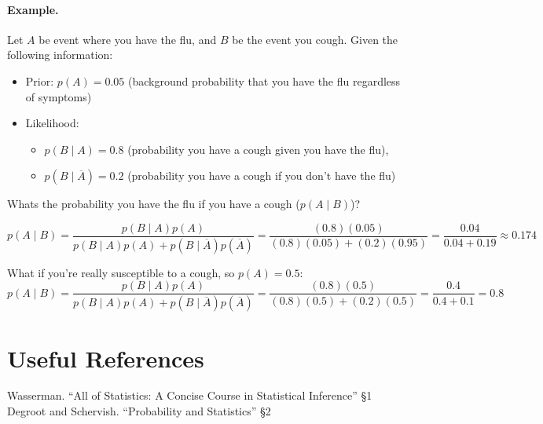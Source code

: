 \paragraph{Example.} 
Let $A$ be event where you have the flu, and $B$ be the event you cough. 
Given the following information: 
\begin{itemize}
\item[] Prior: $p(A)=0.05$ (background probability that you have the flu regardless of symptoms)
\item[] Likelihood:
\begin{itemize} 
\item $p(B\mid A) = 0.8$ (probability you have a cough given you have the flu), 
\item $p(B\mid \overline A) = 0.2$ (probability you have a cough if you don't have the flu)
\end{itemize}
\end{itemize}
Whats the probability you have the flu if you have a cough ($p(A\mid B)$)?

\[p(A\mid B) = \frac{p(B\mid A)p(A)}{p(B\mid A)p(A) + p(B\mid \overline A)p(\overline A)} = \frac{(0.8)(0.05)}{(0.8)(0.05)+(0.2)(0.95)}=\frac{0.04}{0.04+0.19}\approx 0.174\]

What if you're really susceptible to a cough, so $p(A)=0.5$:
\[p(A\mid B) = \frac{p(B\mid A)p(A)}{p(B\mid A)p(A) + p(B\mid \overline A)p(\overline A)} = \frac{(0.8)(0.5)}{(0.8)(0.5)+(0.2)(0.5)}=\frac{0.4}{0.4+0.1}=0.8\]

\section*{Useful References}
Wasserman. ``All of Statistics: A Concise Course in Statistical Inference'' \S 1 
Degroot and Schervish. ``Probability and Statistics'' \S 2



